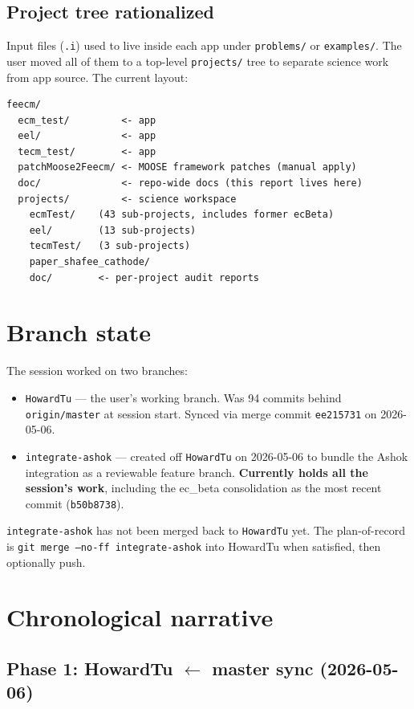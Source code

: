 \documentclass[11pt,letterpaper]{article}
\newenvironment{tightitemize}{\begin{itemize}\setlength\itemsep{0pt}\setlength\parsep{0pt}}{\end{itemize}}
\newcommand{\code}[1]{\texttt{\small #1}}
\begin{document}
\subsection{Project tree rationalized}

Input files (\code{.i}) used to live inside each app under \code{problems/} or \code{examples/}.
The user moved all of them to a top-level \code{projects/} tree to
separate science work from app source. The current layout:

\begin{verbatim}
feecm/
  ecm_test/         <- app
  eel/              <- app
  tecm_test/        <- app
  patchMoose2Feecm/ <- MOOSE framework patches (manual apply)
  doc/              <- repo-wide docs (this report lives here)
  projects/         <- science workspace
    ecmTest/    (43 sub-projects, includes former ecBeta)
    eel/        (13 sub-projects)
    tecmTest/   (3 sub-projects)
    paper_shafee_cathode/
    doc/        <- per-project audit reports
\end{verbatim}

\section{Branch state}

The session worked on two branches:

\begin{tightitemize}
  \item \code{HowardTu} --- the user's working branch. Was 94 commits behind
    \code{origin/master} at session start. Synced via merge commit \code{ee215731}
    on 2026-05-06.
  \item \code{integrate-ashok} --- created off \code{HowardTu} on 2026-05-06 to
    bundle the Ashok integration as a reviewable feature branch. \textbf{Currently
    holds all the session's work}, including the ec\_beta consolidation as the most
    recent commit (\code{b50b8738}).
\end{tightitemize}

\code{integrate-ashok} has not been merged back to \code{HowardTu} yet. The
plan-of-record is \texttt{git merge --no-ff integrate-ashok} into HowardTu when
satisfied, then optionally push.

\section{Chronological narrative}

\subsection{Phase 1: HowardTu $\leftarrow$ master sync (2026-05-06)}
\end{document}
